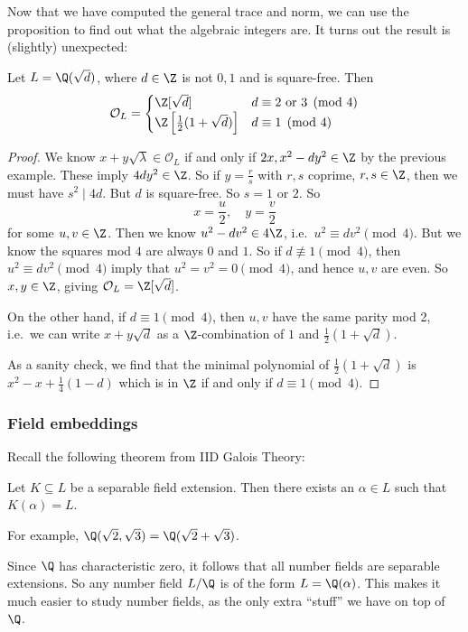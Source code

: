 \documentclass[a4paper]{article}
\begin{document}
Now that we have computed the general trace and norm, we can use the proposition to find out what the algebraic integers are. It turns out the result is (slightly) unexpected:
\begin{lemma}
  Let $L = \Q(\sqrt{d})$, where $d \in \Z$ is not $0, 1$ and is square-free. Then
  \[
    \mathcal{O}_L =
    \begin{cases}
      \Z[\sqrt{d}] & d \equiv 2 \text{ or }3\pmod 4\\
      \Z\left[\frac{1}{2}(1 + \sqrt{d})\right] & d \equiv 1 \pmod 4
    \end{cases}
  \]
\end{lemma}

\begin{proof}
  We know $x + y \sqrt{\lambda} \in \mathcal{O}_L$ if and only if $2x, x^2 - dy^2 \in \Z$ by the previous example. These imply $4dy^2 \in \Z$. So if $y = \frac{r}{s}$ with $r, s$ coprime, $r, s \in \Z$, then we must have $s^2 \mid 4d$. But $d$ is square-free. So $s = 1$ or $2$. So
  \[
    x = \frac{u}{2},\quad y = \frac{v}{2}
  \]
  for some $u, v \in \Z$. Then we know $u^2 - dv^2 \in 4\Z$, i.e.\ $u^2 \equiv dv^2 \pmod 4$. But we know the squares mod $4$ are always $0$ and $1$. So if $d \not\equiv 1 \pmod 4$, then $u^2 \equiv dv^2\pmod 4$ imply that $u^2 = v^2 = 0\pmod 4$, and hence $u, v$ are even. So $x, y \in \Z$, giving $\mathcal{O}_L = \Z[\sqrt{d}]$.

  On the other hand, if $d \equiv 1\pmod 4$, then $u, v$ have the same parity mod 2, i.e.\ we can write $x + y\sqrt{d}$ as a $\Z$-combination of $1$ and $\frac{1}{2}(1 + \sqrt{d})$.

  As a sanity check, we find that the minimal polynomial of $\frac{1}{2}(1 + \sqrt{d})$ is $x^2 - x + \frac{1}{4}(1 - d)$ which is in $\Z$ if and only if $d \equiv 1 \pmod 4$.
\end{proof}

\subsubsection*{Field embeddings}
Recall the following theorem from IID Galois Theory:
\begin{thm}
  Let $K \subseteq L$ be a separable field extension. Then there exists an $\alpha \in L$ such that $K(\alpha) = L$.
\end{thm}
For example, $\Q(\sqrt{2}, \sqrt{3}) = \Q(\sqrt{2} + \sqrt{3})$.

Since $\Q$ has characteristic zero, it follows that all number fields are separable extensions. So any number field $L/\Q$ is of the form $L = \Q(\alpha)$. This makes it much easier to study number fields, as the only extra ``stuff'' we have on top of $\Q$.
\end{document}
